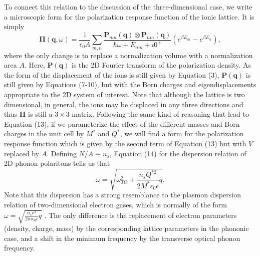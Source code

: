 \documentclass[superscriptaddress,reprint,prb]{revtex4-1}
\begin{document}
To connect this relation to the discussion of the three-dimensional case, we write a microscopic form for the polarization response function of the ionic lattice. It is simply
\begin{equation}
\boldsymbol{\Pi}(\mathbf{q},\omega) =  \frac{1}{\epsilon_0 A}\sum\limits_{m,n}\frac{\mathbf{P}_{mn}(\mathbf{q})\otimes\mathbf{P}_{nm}(\mathbf{q})}{\hbar\omega + E_{nm}+i0^+}\left(e^{\beta E_m}-e^{\beta E_n} \right),
\end{equation}
where the only change is to replace a normalization volume with a normalization area $A$. Here, $\mathbf{P}(\mathbf{q})$ is the 2D Fourier transform of the polarization density. As the form of the displacement of the ions is still given by Equation (3), $\mathbf{P}(\mathbf{q})$ is still given by Equations (7-10), but with the Born charges and eigendisplacements appropriate to the 2D system of interest. Note that although the lattice is two dimensional, in general, the ions may be displaced in any three directions and thus $\boldsymbol{\Pi}$ is still a $3\times3$ matrix. Following the same kind of reasoning that lead to Equation (13), if we parameterize the effect of the different masses and Born charges in the unit cell by $M^*$ and $Q^*$, we will find a form for the polarization response function which is given by the second term of Equation (13) but with $V$ replaced by $A$. Defining $N/A \equiv n_s$, Equation (14) for the dispersion relation of 2D phonon polaritons tells us that
\begin{equation}
\omega = \sqrt{\omega_{TO}^2+\frac{n_sQ^{*2}}{2M^*\epsilon_0\epsilon}q}.
\end{equation}
Note that this dispersion has a strong resemblance to the plasmon dispersion relation of two-dimensional electron gases, which is normally of the form\cite{stern1967polarizability} $\omega = \sqrt{\frac{n_s e^2  }{2m\epsilon_0\epsilon}q}$ . The only difference is the replacement of electron parameters (density, charge, mass) by the corresponding lattice parameters in the phononic case, and a shift in the minimum frequency by the transverse optical phonon frequency. 
\end{document}
